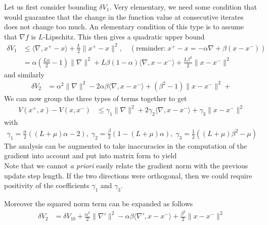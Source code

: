 \documentclass{article}
\newcommand{\xp}{{x^+}}
\newcommand{\xx}{{x}}
\newcommand{\xm}{{x^-}}
\begin{document}
Let us first consider bounding $\delta V_1$. Very elementary, we need some condition that would guarantee that the change in the function value at consecutive iterates does not change too much. An elementary condition of this type is to assume that $\nabla f$ is $L$-Lipschitz. This then gives a quadratic upper bound
\begin{align}
\delta V_1 & \le  \langle \nabla, \xp-\xx \rangle + \frac L2 \| \xp - \xx \|^2, \quad \left(\text{reminder:} \; \xp - \xx = - \alpha \nabla +  \beta ( \xx - \xm) \right)\\
& = \alpha \left( \frac{L \alpha}{2}-1 \right) \|\nabla\|^2 
+ L \beta (1-\alpha) \langle \nabla, \xx - \xm \rangle  
+ \frac{L\beta^2}{2} \| \xx - \xm\|^2
\end{align}
and similarly 
\begin{align}
\delta V_2 & =  \alpha^2 \| \nabla \|^2 - 2 \alpha \beta \langle \nabla, \xx - \xm \rangle + \left( \beta^2 -1 \right) \| \xx - \xm\|^2  +
\end{align}
We can now group the three types of terms together to get 
\begin{align}
V(x^+,x) - V(x,x^-) & \le \gamma_1 \| \nabla \|^2 + 2\gamma_2 \langle \nabla, \xx - \xm \rangle + \gamma_3 \| \xx - \xm\|^2
\end{align}
with
\begin{align}
\gamma_1 = \frac\alpha2 \left( (L+\mu) \alpha-2\right), \; 
\gamma_2 = \frac\beta2 (1-(L+\mu)\alpha) , \; 
\gamma_3 = \frac12 \left( (L+\mu) \beta^2-\mu\right)
\end{align}
The analysis can be augmented to take inaccuracies in the computation of the gradient into account and put into matrix form to yield \cite[Lemma 1]{zavriev1993heavy}\\


Note that we cannot \textit{a priori} easily relate the gradient norm with the previous update step length. If the two directions were orthogonal, then we could require positivity of the coefficients $\gamma_1$ and $\gamma_3$. 
\newpage

Moreover the squared norm term can be expanded as follows
\begin{align}
\delta V_{2} & = \delta V_{1b} + \frac{\alpha^2}{2} \| \nabla'\|^2 - \alpha \beta \langle \nabla', \xx - \xm \rangle + \frac{\beta^2}{2} 
\| \xx - \xm\|^2 
\end{align}



\end{document}
